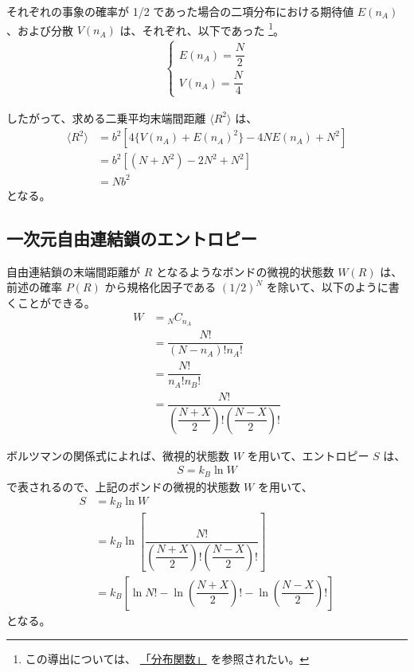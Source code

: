 \documentclass[uplatex,dvipdfmx,a4paper,11pt, titlepage]{jsarticle}
\begin{document}
\begin{appendix}
それぞれの事象の確率が 1/2 であった場合の二項分布における期待値 $E(n_A)$、および分散 $V(n_A)$ は、それぞれ、以下であった
\footnote
{
この導出については、
\href{https://dl.dropboxusercontent.com/u/18899343/Probability/Prob_Dist/Prob_Dist.pdf}{「分布関数」}
を参照されたい。
}。
\begin{align*}
\begin{cases}
E(n_A)=\dfrac{N}{2} \\[8pt]
V(n_A)=\dfrac{N}{4}
\end{cases}
\end{align*}

したがって、求める二乗平均末端間距離 $\langle R^2 \rangle$ は、
\begin{align*}
\langle R^2 \rangle 
	&= b^2 \left[ 4 \{V(n_A)+E(n_A)^2\} - 4N E(n_A) + N^2 \right] \\
	&= b^2 [ (N +N^2) - 2N^2 + N^2 ] \\
	&= N b^2
\end{align*}
となる。

\subsection{一次元自由連結鎖のエントロピー}
\label{ssec:1DRW_S}

自由連結鎖の末端間距離が $R$ となるようなボンドの微視的状態数 $W(R)$ は、前述の確率 $P(R)$ から規格化因子である $(1/2)^N$ を除いて、以下のように書くことができる。
\begin{align*}
W 
	&= {}_N C_{n_A} \\
	&= \dfrac{N!}{(N-n_A)! n_A!} \\[8pt]
	&= \dfrac{N!}{n_A! n_B!} \\
	&= \dfrac{N!}{ \left( \dfrac{N + X}{2} \right)! \left( \dfrac{N - X}{2} \right)!}
\end{align*}

ボルツマンの関係式によれば、微視的状態数 $W$ を用いて、エントロピー $S$ は、
\begin{align*}
S=k_B \ln W
\end{align*}
で表されるので、上記のボンドの微視的状態数 $W$ を用いて、
\begin{align*}
S 
	&= k_B \ln W \\
	&= k_B \ln \left[ \dfrac{N!}{ \left( \dfrac{N+X}{2} \right)! \left( \dfrac{N-X}{2} \right)!} \right] \\
	&= k_B \left[ \ln N! -\ln \left( \dfrac{N+X}{2}\right)! -\ln \left( \dfrac{N-X}{2}\right)! \right]
\end{align*}
となる。


\end{appendix}
\end{document}
